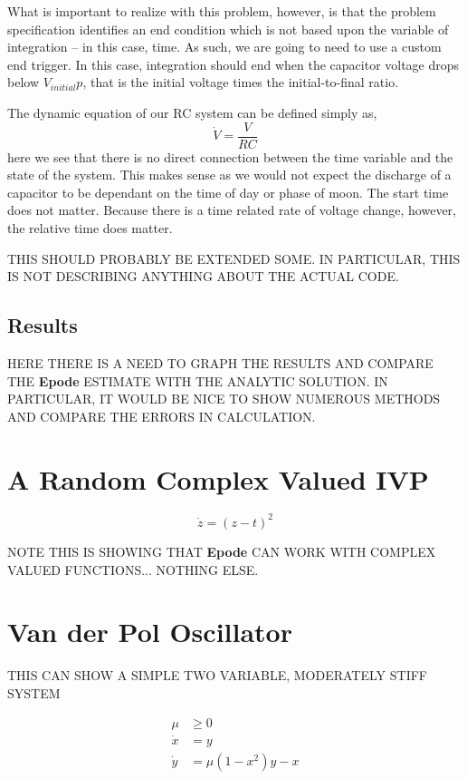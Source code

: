 \documentclass[letterpaper,10pt]{book}
\newcommand{\epode}[0]{\textbf{Epode}}
\begin{document}
      What is important to realize with this problem, however, is that the problem specification identifies an end condition which is not based upon the variable of integration -- in this case, time.  As such, we are going to need to use a custom end trigger.  In this case, integration should end when the capacitor voltage drops below $V_{initial}p$, that is the initial voltage times the initial-to-final ratio.
      
      The dynamic equation of our RC system can be defined simply as,
      \begin{equation}
	\dot{V} = \frac{V}{RC}
      \end{equation}
      here we see that there is no direct connection between the time variable and the state of the system.  This makes sense as we would not expect the discharge of a capacitor to be dependant on the time of day or phase of moon.  The start time does not matter.  Because there is a time related rate of voltage change, however, the relative time does matter.
      
      THIS SHOULD PROBABLY BE EXTENDED SOME. IN PARTICULAR, THIS IS NOT DESCRIBING ANYTHING ABOUT THE ACTUAL CODE.
      
      \subsection{Results}
      HERE THERE IS A NEED TO GRAPH THE RESULTS AND COMPARE THE \epode{} ESTIMATE WITH THE ANALYTIC SOLUTION.  IN PARTICULAR, IT WOULD BE NICE TO SHOW NUMEROUS METHODS AND COMPARE THE ERRORS IN CALCULATION.
    
    \section{A Random Complex Valued IVP}
      \begin{equation}
	\dot{z} = (z - t)^{2}
      \end{equation}

      NOTE THIS IS SHOWING THAT \epode{} CAN WORK WITH COMPLEX VALUED FUNCTIONS... NOTHING ELSE.
      
    \section{Van der Pol Oscillator}
      THIS CAN SHOW A SIMPLE TWO VARIABLE, MODERATELY STIFF SYSTEM
      
      \begin{equation}
	\begin{aligned}
	  \mu{} &\geq{} 0\\
	  \dot{x} &= y\\
	  \dot{y} &= \mu{}(1 - x^{2})y - x
	\end{aligned}
      \end{equation}
\end{document}
